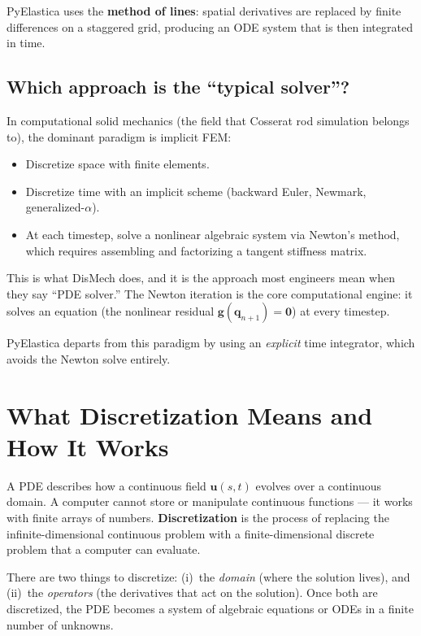 \documentclass[11pt]{article}
\newcommand{\vect}[1]{\mathbf{#1}}
\begin{document}
\noindent
PyElastica uses the \textbf{method of lines}: spatial derivatives are replaced by finite differences on a staggered grid, producing an ODE system that is then integrated in time.

\subsection{Which approach is the ``typical solver''?}

In computational solid mechanics (the field that Cosserat rod simulation belongs to), the dominant paradigm is implicit FEM:

\begin{itemize}
  \item Discretize space with finite elements.
  \item Discretize time with an implicit scheme (backward Euler, Newmark, generalized-$\alpha$).
  \item At each timestep, solve a nonlinear algebraic system via Newton's method, which requires assembling and factorizing a tangent stiffness matrix.
\end{itemize}

This is what DisMech does, and it is the approach most engineers mean when they say ``PDE solver.''
The Newton iteration is the core computational engine: it solves an equation (the nonlinear residual $\vect{g}(\vect{q}_{n+1}) = \vect{0}$) at every timestep.

PyElastica departs from this paradigm by using an \emph{explicit} time integrator, which avoids the Newton solve entirely.

\section{What Discretization Means and How It Works}
\label{sec:discretization}

A PDE describes how a continuous field $\vect{u}(s, t)$ evolves over a continuous domain.
A computer cannot store or manipulate continuous functions --- it works with finite arrays of numbers.
\textbf{Discretization} is the process of replacing the infinite-dimensional continuous problem with a finite-dimensional discrete problem that a computer can evaluate.

There are two things to discretize: (i)~the \emph{domain} (where the solution lives), and (ii)~the \emph{operators} (the derivatives that act on the solution).
Once both are discretized, the PDE becomes a system of algebraic equations or ODEs in a finite number of unknowns.
\end{document}
